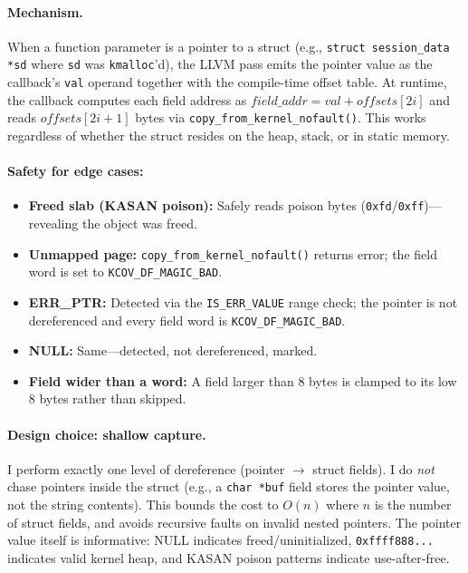 \documentclass{article}
\begin{document}
\paragraph{Mechanism.} When a function parameter is a pointer to a struct
(e.g., \texttt{struct session\_data *sd} where \texttt{sd} was
\texttt{kmalloc}'d), the LLVM pass emits the pointer value as the callback's
\texttt{val} operand together with the compile-time offset table. At runtime,
the callback computes each field address as
$\mathit{field\_addr} = \mathit{val} + \mathit{offsets}[2i]$ and reads
$\mathit{offsets}[2i+1]$ bytes via
\texttt{copy\_from\_kernel\_nofault()}. This works regardless of whether the
struct resides on the heap, stack, or in static memory.

\paragraph{Safety for edge cases:}
\begin{itemize}[nosep]
  \item \textbf{Freed slab (KASAN poison):} Safely reads poison bytes
        (\texttt{0xfd}/\texttt{0xff})---revealing the object was freed.
  \item \textbf{Unmapped page:} \texttt{copy\_from\_kernel\_nofault()} returns
        error; the field word is set to \texttt{KCOV\_DF\_MAGIC\_BAD}.
  \item \textbf{ERR\_PTR:} Detected via the \texttt{IS\_ERR\_VALUE} range check;
        the pointer is not dereferenced and every field word is
        \texttt{KCOV\_DF\_MAGIC\_BAD}.
  \item \textbf{NULL:} Same---detected, not dereferenced, marked.
  \item \textbf{Field wider than a word:} A field larger than 8 bytes is
        clamped to its low 8 bytes rather than skipped.
\end{itemize}

\paragraph{Design choice: shallow capture.} I perform exactly one level of
dereference (pointer $\to$ struct fields). I do \emph{not} chase pointers
inside the struct (e.g., a \texttt{char *buf} field stores the pointer value,
not the string contents). This bounds the cost to $O(n)$ where $n$ is the
number of struct fields, and avoids recursive faults on invalid nested pointers.
The pointer value itself is informative: NULL indicates freed/uninitialized,
\texttt{0xffff888...} indicates valid kernel heap, and KASAN poison patterns
indicate use-after-free.
\end{document}
